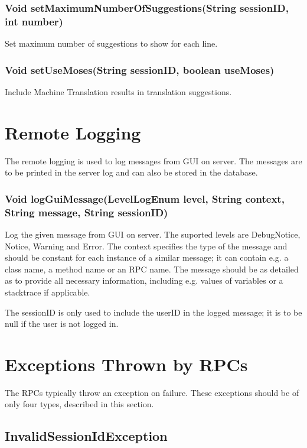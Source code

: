 \subsubsection{Void setMaximumNumberOfSuggestions(String sessionID, int number)}
Set maximum number of suggestions to show for each line.

\subsubsection{Void setUseMoses(String sessionID, boolean useMoses)}
Include Machine Translation results in translation suggestions.

\section{Remote Logging}
\label{sec:rpc:remotelog}

The remote logging is used to log messages from GUI on server. The messages are to be printed in the server log and can also be stored in the database.

\subsubsection{Void logGuiMessage(LevelLogEnum level, String context, String message, String sessionID)}
Log the given message from GUI on server.
The suported levels are DebugNotice, Notice, Warning and Error.
The context specifies the type of the message and should be constant for each instance of a similar message; it can contain e.g. a class name, a method name or an RPC name. The message should be as detailed as to provide all necessary information, including e.g. values of variables or a stacktrace if applicable.

The sessionID is only used to include the userID in the logged message; it is to be null if the user is not logged in.

\section{Exceptions Thrown by RPCs}
\label{sec:rpc:exceptions}

The RPCs typically throw an exception on failure. These exceptions should be of only four types, described in this section.

\subsection{InvalidSessionIdException}

